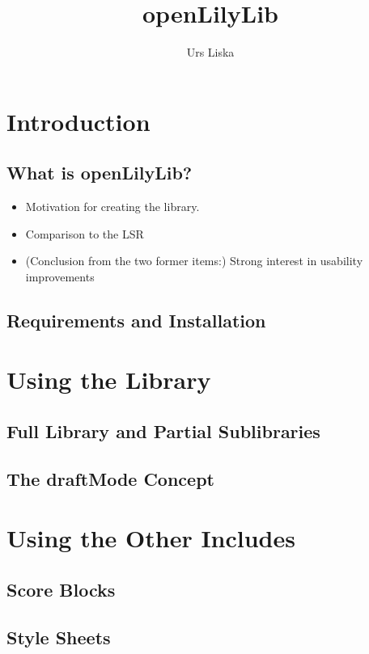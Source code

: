\documentclass[%
	11pt,
	a4paper,
	DIV=13]{scrbook}
\title{openLilyLib}
\author{Urs Liska}
\begin{document}
\maketitle
\tableofcontents

\chapter{Introduction}

\section{What is openLilyLib?}
\begin{itemize}
\item Motivation for creating the library.
\item Comparison to the LSR
\item (Conclusion from the two former items:) Strong interest in usability improvements
\end{itemize}

\section{Requirements and Installation}



\chapter{Using the Library}

\section{Full Library and Partial Sublibraries}

\section{The draftMode Concept}




\chapter{Using the Other Includes}

\section{Score Blocks}

\section{Style Sheets}
\end{document}
